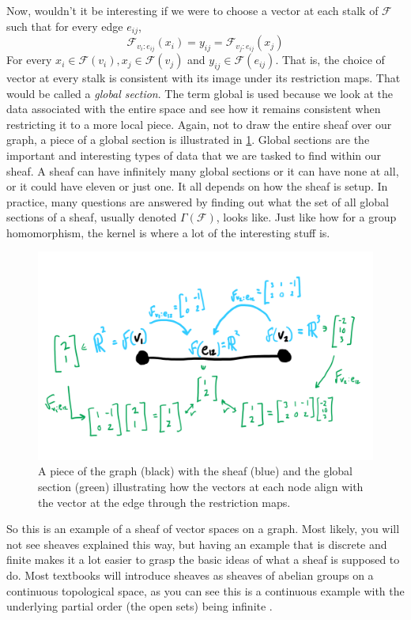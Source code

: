 \documentclass{tufte-handout}
\newcommand{\F}{\mathcal{F}}
\begin{document}
Now, wouldn't it be interesting if we were to choose a vector at each stalk of $\F$ such that for every edge $e_{ij}$, 
\[
\F_{v_i:e_{ij}}(x_i) = y_{ij} = \F_{v_j:e_{ij}}(x_j)
\]
For every $x_i \in \F(v_i), x_j \in \F(v_j) $ and $y_{ij} \in \F(e_{ij})$. That is, the choice of vector at every stalk is consistent with its image under its restriction maps. That would be called a \emph{global section}. The term global is used because we look at the data associated with the entire space and see how it remains consistent when restricting it to a more local piece. Again, not to draw the entire sheaf over our graph, a piece of a global section is illustrated in \cref{fig:globalsection}. Global sections are the important and interesting types of data that we are tasked to find within our sheaf. A sheaf can have infinitely many global sections or it can have none at all, or it could have eleven or just one. It all depends on how the sheaf is setup. In practice, many questions are answered by finding out what the set of all global sections of a sheaf, usually denoted $\Gamma(\F)$, looks like. Just like how for a group homomorphism, the kernel is where a lot of the interesting stuff is. 



\begin{figure}[h!]
    \centering
    \includegraphics{globalsection.png}
    \caption{A piece of the graph (black) with the sheaf (blue) and the global section (green) illustrating how the vectors at each node align with the vector at the edge through the restriction maps.}
    \label{fig:globalsection}
\end{figure}


So this is an example of a sheaf of vector spaces on a graph. Most likely, you will not see sheaves explained this way, but having an example that is discrete and finite makes it a lot easier to grasp the basic ideas of what a sheaf is supposed to do. Most textbooks will introduce sheaves as sheaves of abelian groups on a continuous topological space, as you can see this is a continuous example with the underlying partial order (the open sets) being infinite%
. 
\end{document}

